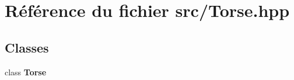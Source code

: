 \section{Référence du fichier src/\-Torse.hpp}
\label{_torse_8hpp}
\subsection*{Classes}
\begin{DoxyCompactItemize}
\item 
class {\bf Torse}
\end{DoxyCompactItemize}
